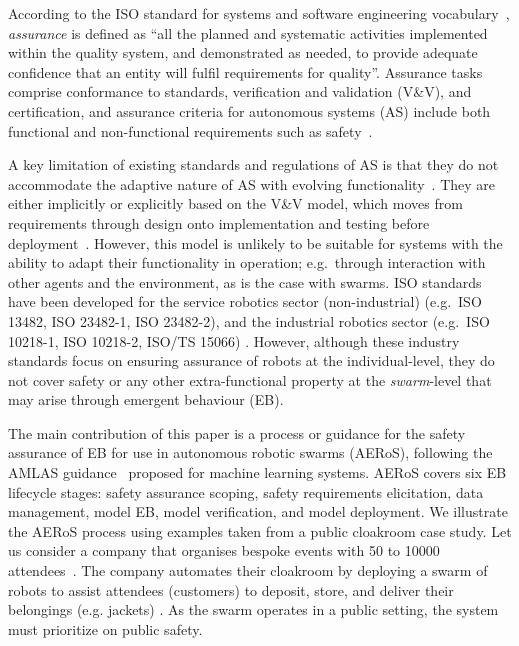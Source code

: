 \documentclass[runningheads]{llncs}
\begin{document}
According to the ISO standard for systems and software engineering vocabulary~\cite{ISO24765:2017}, \emph{assurance} is defined as ``all the planned and systematic activities implemented within the quality system, and demonstrated as needed, to provide adequate confidence that an entity will fulfil requirements for quality''. 
Assurance tasks comprise conformance to standards, verification and validation (V\&V), and certification, and assurance criteria for autonomous systems (AS) include both functional and non-functional requirements such as safety~\cite{Cheng2014}. 

A key limitation of existing standards and regulations of AS is that they do not accommodate the adaptive nature of AS with evolving functionality~\cite{Fisher2020}. 
They are either implicitly or explicitly based on the V\&V model, which moves from requirements through design onto implementation and testing before deployment~\cite{Jia2021}. 
However, this model is unlikely to be suitable for systems with the ability to adapt their functionality in operation; e.g.\ through interaction with other agents and the environment, as is the case with swarms. 
ISO standards have been developed for the service robotics sector (non-industrial) (e.g.\ ISO 13482, ISO 23482-1, ISO 23482-2), and the industrial robotics sector (e.g.\ ISO 10218-1, ISO 10218-2, ISO/TS 15066) \cite{Abeywickrama2022}. 
However, although these industry standards focus on ensuring assurance of robots at the individual-level, they do not cover safety or any other extra-functional property at the \emph{swarm}-level that may arise through emergent behaviour (EB). %

The main contribution of this paper is a process or guidance for the safety assurance of EB for use in autonomous robotic swarms (AERoS), following the AMLAS guidance~\cite{Hawkins2021} proposed for machine learning systems. 
AERoS covers six EB lifecycle stages: safety assurance scoping, safety requirements elicitation, data management, model EB, model verification, and model deployment. 
We illustrate the AERoS process using examples taken from a public cloakroom case study. 
Let us consider a company that organises bespoke events with 50 to 10000 attendees~\cite{Jones2020}. 
The company automates their cloakroom by deploying a swarm of robots to assist attendees (customers) to deposit, store, and deliver their belongings (e.g. jackets) \cite{Jones2020}. 
As the swarm operates in a public setting, the system must prioritize on public safety. 
\end{document}
